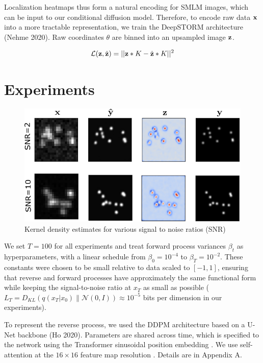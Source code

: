 \documentclass{article}
\begin{document}
Localization heatmaps thus form a natural encoding for SMLM images, which can be input to our conditional diffusion model. Therefore, to encode raw data $\bold{x}$ into a more tractable representation, we train the DeepSTORM architecture (Nehme 2020). Raw coordinates $\theta$ are binned into an upsampled image $\bold{z}$. 

\begin{equation}
\mathcal{L}(\bold{z},\hat{\bold{z}}) = \lvert\lvert\bold{z}* K - \hat{\bold{z}}* K \lvert\lvert^2
\end{equation} 


\section{Experiments}

\begin{figure}
\includegraphics[scale=0.75]{Samples.png}
\caption{Kernel density estimates for various signal to noise ratios (SNR)}
\end{figure}

We set $T = 100$ for all experiments and treat forward process variances $\beta_{t}$ as hyperparameters, with a linear schedule from $\beta_{0}=10^{-4}$ to $\beta_{T}=10^{-2}$.
These constants were chosen to be small relative to data scaled to $[-1, 1]$, ensuring that reverse and forward processes have approximately the same functional form while keeping the signal-to-noise ratio at $x_T$ as small as possible ($L_T = D_{KL}(q(x_T | x_0) \| \mathcal{N}(0, I)) \approx 10^{-5}$ bits per dimension in our experiments).

To represent the reverse process, we used the DDPM architecture based on a U-Net backbone (Ho 2020). Parameters are shared across time, which is specified to the network using the Transformer sinusoidal position embedding \cite{cite60}. We use self-attention at the $16 \times 16$ feature map resolution \cite{cite63,cite60}. Details are in Appendix A.
\end{document}
